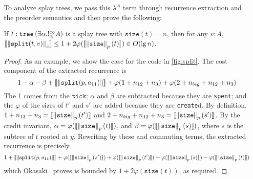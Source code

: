To analyze splay trees, we pass this $\lambda^A$ term through recurrence extraction and the preorder semantics and then prove the following:
\begin{theorem}
If $t : \texttt{tree}\left(\exists \alpha . !^\infty_\alpha A\right)$ is a splay tree with $\texttt{size}(t) = n$, then for any $v : A$, $\llbracket \left\lVert\texttt{split}(t,v)\right\rVert_c \rrbracket \leq 1 + 2\varphi(\llbracket \left\lVert\texttt{size}\right\rVert_p(t) \rrbracket) \in O(\lg n)$.
\end{theorem}
\begin{proof}
As an example, we show the case for the code in \autoref{fig:split}. The cost component of the extracted recurrence is
\[
1-\alpha - \beta + \llbracket \left\lVert\texttt{split}(p,a_{11})\right\rVert \rrbracket + \varphi(1 + n_{12} + n_3) + \varphi(2 + n_{big} + n_{12} + n_3)
\]
The 1 comes from the $\texttt{tick}$; $\alpha$ and $\beta$ are subtracted because they are \texttt{spent}; and the $\varphi$ of the sizes of $t'$ and $s'$ are added because they are \texttt{create}d.  
By definition, $1 + n_{12} + n_3 = \llbracket \left\lVert\texttt{size}\right\rVert_p(t') \rrbracket$ and $2 + n_{big} + n_{12} + n_3 = \llbracket \left\lVert\texttt{size}\right\rVert_p(s') \rrbracket$. By the credit invariant, $\alpha = \varphi(\llbracket \left\lVert\texttt{size}\right\rVert_p(t) \rrbracket)$, and $\beta = \varphi(\llbracket \left\lVert\texttt{size}\right\rVert_p(s) \rrbracket)$, where $s$ is the subtree of $t$ rooted at $y$. Rewriting by these and commuting terms, the extracted recurrence is precisely
\[1 + \llbracket \left\lVert\texttt{split}(p,a_{11})\right\rVert \rrbracket + \varphi(\llbracket \left\lVert\texttt{size}\right\rVert_p(s') \rrbracket) + \varphi(\llbracket \left\lVert\texttt{size}\right\rVert_p(t') \rrbracket) - \varphi(\llbracket \left\lVert\texttt{size}\right\rVert_p(s) \rrbracket) - \varphi(\llbracket \left\lVert\texttt{size}\right\rVert_p(t) \rrbracket)
\]
which Okasaki~\cite[Theorem 5.2]{okasaki:purely-functional-data-structures} proves is bounded by $1 + 2\varphi(\texttt{size}(t))$, as required.
\end{proof}

